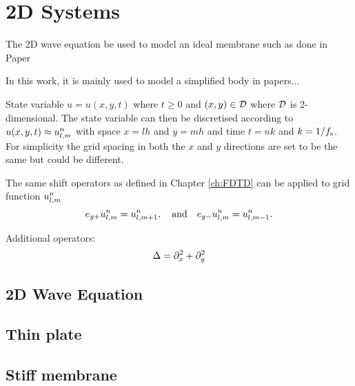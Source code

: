 \chapter{2D Systems}\label{ch:2Dsyst}
The 2D wave equation be used to model an ideal membrane such as done in Paper 

In this work, it is mainly used to model a simplified body in papers...


State variable $u = u(x,y,t)$  where $t\geq 0$ and $(x,y) \in \mathcal{D}$ where $\mathcal{D}$ is 2-dimensional. The state variable can then be discretised according to $u(x, y, t) \approx u_{l,m}^n$ with space $x = lh$ and $y = mh$ and time $t = nk$ and $k=1/f_\text{s}$. For simplicity the grid spacing in both the $x$ and $y$ directions are set to be the same but could be different.


The same shift operators as defined in Chapter \ref{ch:FDTD} can be applied to grid function $u_{l,m}^n$ 
\begin{equation}
    e_{y+}u_{l,m}^n = u_{l, m+1}^n,\quad \text{and}\quad e_{y-}u_{l,m}^n= u_{l, m-1}^n.
\end{equation}

Additional operators:
\begin{equation}
    \Delta = \partial_x^2 + \partial_y^2
\end{equation}

\section{2D Wave Equation}
\section{Thin plate}
\section{Stiff membrane}